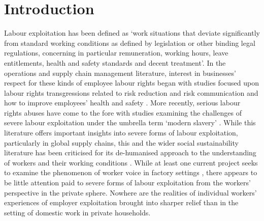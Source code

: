 \documentclass[
  12pt,
  letterpaper,
  DIV=11,
  numbers=noendperiod]{scrartcl}
\theoremstyle{plain}
\theoremstyle{definition}
\begin{document}
\newpage

\section{Introduction}\label{introduction}

Labour exploitation has been defined as `work situations that deviate 
significantly from standard working conditions as defined by legislation
or other binding legal regulations, concerning in particular
remuneration, working hours, leave entitlements, health and safety
standards and decent treatment'\autocite[10]{european_union_for_fundamental_rights_severe_2015}. In the operations and supply chain management literature,
interest in businesses' respect for these kinds of employee labour rights began with
studies focused upon labour rights transgressions related to risk
reduction and risk communication and how to improve
employees' health and safety \autocite{chinander_aligning_2001,wolf_operationalizing_2001}. More recently, 
serious labour rights abuses have come to the fore with studies
examining the challenges of severe labour exploitation under the umbrella term `modern slavery' \autocite{gold_modern_2015,new_modern_2015,benstead_horizontal_2018,stevenson_modern_2018}. While this literature
offers important insights into severe forms of labour exploitation, particularly
in global supply chains, this and the wider social sustainability literature has
been criticised for its de-humanised approach to the understanding
of workers and their working conditions \autocite{soundararajan_humanizing_2021}. While at least one current
project seeks to examine the phenomenon of worker voice in factory
settings  \autocite{leverhulme_trust_research_2022}, there appears to be little attention paid to severe forms of labour exploitation from the workers' perspective in the private sphere. Nowhere are the realities of individual workers' experiences of employer exploitation brought into sharper relief than in the setting of domestic
work in private households.
\end{document}
